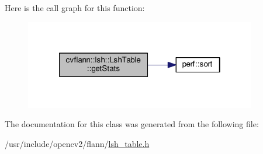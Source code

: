 Here is the call graph for this function\-:\nopagebreak
\begin{figure}[H]
\begin{center}
\leavevmode
\includegraphics[width=286pt]{classcvflann_1_1lsh_1_1LshTable_a891b6401cfe3f0d565185f983bcaed8c_cgraph}
\end{center}
\end{figure}




The documentation for this class was generated from the following file\-:\begin{DoxyCompactItemize}
\item 
/usr/include/opencv2/flann/\hyperlink{lsh__table_8h}{lsh\-\_\-table.\-h}\end{DoxyCompactItemize}
